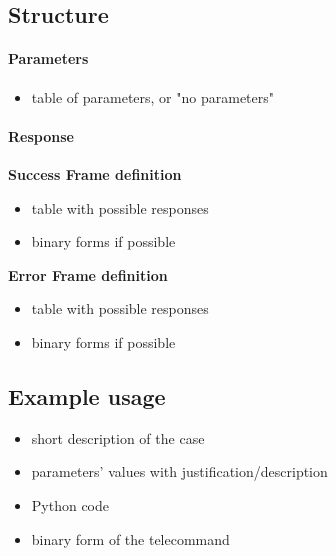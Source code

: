 \subsection{Structure}

\paragraph{Parameters}
    \begin{itemize}
    \item table of parameters, or "no parameters"
    \end{itemize}

\paragraph{Response}
    \textbf{Success Frame definition}
    \begin{itemize}
        \item table with possible responses
        \item binary forms if possible
    \end{itemize}


    \textbf{Error Frame definition}
    \begin{itemize}
        \item table with possible responses
        \item binary forms if possible
    \end{itemize}

\subsection{Example usage}

\begin{itemize}
    \item short description of the case
    \item parameters' values with justification/description
    \item Python code
    \item binary form of the telecommand
\end{itemize}
